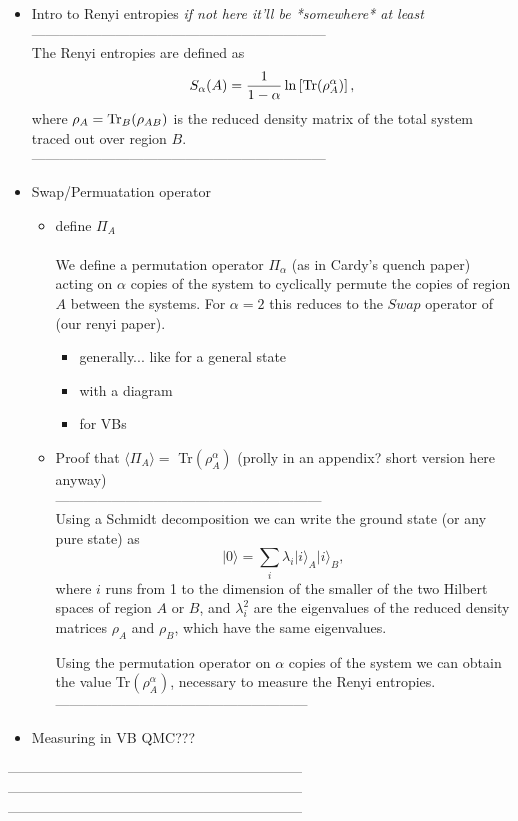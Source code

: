 \documentclass[prb,aps,twocolumn,floatfix,amsmath,amssymb,superscriptaddress,tightenlines]{revtex4}
\begin{document}
\noindent
\begin{itemize}
\item{Intro to Renyi entropies {\it if not here it'll be *somewhere* at least}}\\
---------------------------------------------------------------\\
The Renyi entropies are defined as 
\begin{equation} \label{renyi}
S_{\alpha}(A) = \frac{1}{1-\alpha}\ln \left[ {\rm Tr}(\rho_A^{\alpha}) \right],
\end{equation}
where $\rho_A = {\rm Tr}_B (\rho_{AB})$ is the reduced density matrix of the total system traced out over region $B$.\\
---------------------------------------------------------------
\item{Swap/Permuatation operator}
	\begin{itemize}
	\item{define $\Pi_A$}\\\\
	We define a permutation operator $\Pi_{\alpha}$ (as in Cardy's quench paper) acting on $\alpha$ copies of the system to cyclically permute the copies of region $A$ between the systems. 
For $\alpha = 2$ this reduces to the $Swap$ operator of (our renyi paper).\\
		\begin{itemize}
		\item{generally... like for a general state}
		\item{with a diagram}
		\item{for VBs}
		\end{itemize}
	\item{Proof that $\langle\Pi_A\rangle =$ Tr$(\rho_A^{\alpha})$ (prolly in an appendix? short version here anyway)} \\
	---------------------------------------------------------\\

Using a Schmidt decomposition we can write the ground state (or any pure state) as
\begin{equation}
\lvert 0 \rangle = \sum_i \lambda_i \lvert i \rangle_A \lvert i \rangle_B,
\end{equation}
where $i$ runs from 1 to the dimension of the smaller of the two Hilbert spaces of region $A$ or $B$, and $\lambda_i^2$ are the eigenvalues of the reduced density matrices $\rho_A$ and $\rho_B$, which have the same eigenvalues.

Using the permutation operator on $\alpha$ copies of the system we can obtain the value Tr$(\rho_A^{\alpha})$, necessary to measure the Renyi entropies. \\
------------------------------------------------------
	\end{itemize}
	\item{Measuring in VB QMC???}
\end{itemize}
---------------------------------------------------------------\\
---------------------------------------------------------------\\
---------------------------------------------------------------\\
\end{document}
